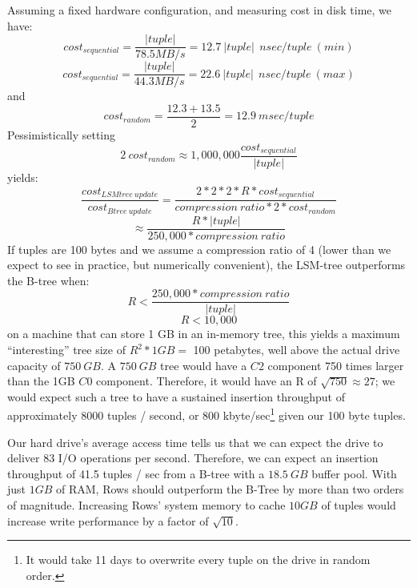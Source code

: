 \documentclass{sig-alternate-sigmod08}
\newcommand{\rows}{Rows\xspace}
\newcommand{\rowss}{Rows'\xspace}
\begin{document}

Assuming a fixed hardware configuration, and measuring cost in disk
time, we have:
\[
   cost_{sequential}=\frac{|tuple|}{78.5MB/s}=12.7~|tuple|~~nsec/tuple~(min)
\]
\[
   cost_{sequential}=\frac{|tuple|}{44.3MB/s}=22.6~|tuple|~~nsec/tuple~(max)
\]
and
\[
   cost_{random}=\frac{12.3+13.5}{2} = 12.9~msec/tuple
\]
Pessimistically setting
\[
2~cost_{random}\approx1,000,000\frac{cost_{sequential}}{|tuple|}
\] yields: \[
    \frac{cost_{LSMtree~update}}{cost_{Btree~update}}=\frac{2*2*2*R*cost_{sequential}}{compression~ratio*2*cost_{random}}
\]
\[
   \approx\frac{R*|tuple|}{250,000*compression~ratio}
\]
If tuples are 100 bytes and we assume a compression ratio of 4 (lower
than we expect to see in practice, but numerically convenient), the
LSM-tree outperforms the B-tree when:
\[
    R < \frac{250,000*compression~ratio}{|tuple|}
\]
\[
    R < 10,000
\]
on a machine that can store 1 GB in an in-memory tree, this yields a
maximum ``interesting'' tree size of $R^2*1GB = $ 100 petabytes, well
above the actual drive capacity of $750~GB$.  A $750~GB$ tree would
have a $C2$ component 750 times larger than the 1GB $C0$ component.
Therefore, it would have an R of $\sqrt{750}\approx27$; we would
expect such a tree to have a sustained insertion throughput of
approximately 8000 tuples / second, or 800 kbyte/sec\footnote{It would
  take 11 days to overwrite every tuple on the drive in random order.}
given our 100 byte tuples.

Our hard drive's average access time tells
us that we can expect the drive to deliver 83 I/O operations per
second.  Therefore, we can expect an insertion throughput of 41.5
tuples / sec from a B-tree with a $18.5~GB$ buffer pool.  With just $1GB$ of RAM, \rows should outperform the
B-Tree by more than two orders of magnitude.  Increasing \rowss system
memory to cache $10 GB$ of tuples would increase write performance by a
factor of $\sqrt{10}$.
\end{document}
